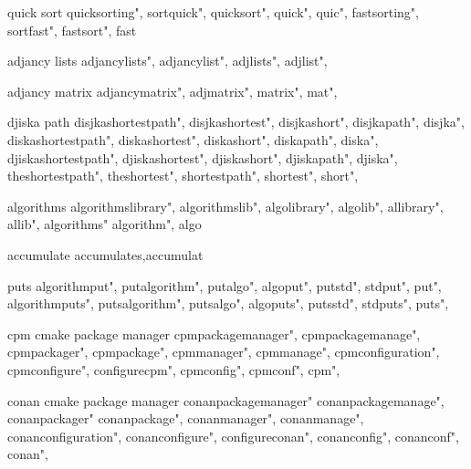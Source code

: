          quick sort 
        quicksorting",  
        sortquick",  
        quicksort",  
        quick",  
        quic",  
        fastsorting",  
        sortfast",  
        fastsort",  
        fast
        
         adjancy lists
        adjancylists",  
        adjancylist",  
        adjlists",  
        adjlist",  
        
         adjancy matrix 
        adjancymatrix",  
        adjmatrix",  
        matrix",  
        mat",  
        
         djiska path 
        disjkashortestpath",  
        disjkashortest",  
        disjkashort",  
        disjkapath",  
        disjka",  
        diskashortestpath",  
        diskashortest",  
        diskashort",  
        diskapath",  
        diska",  
        djiskashortestpath",  
        djiskashortest",  
        djiskashort",  
        djiskapath",  
        djiska",  
        theshortestpath",  
        theshortest",  
        shortestpath",  
        shortest",  
        short",  
        
         algorithms 
        algorithmslibrary", 
        algorithmslib",
        algolibrary",
        algolib",
        allibrary",
        allib",
        algorithms"
        algorithm",
        algo
        
         accumulate
        accumulates,accumulat
        
         puts 
        algorithmput",  
        putalgorithm",  
        putalgo",  
        algoput",  
        putstd",  
        stdput",  
        put",  
        algorithmputs",  
        putsalgorithm",  
        putsalgo",  
        algoputs",  
        putsstd",  
        stdputs",  
        puts",  
        
         cpm cmake package manager
        cpmpackagemanager",  
        cpmpackagemanage",  
        cpmpackager",  
        cpmpackage",  
        cpmmanager",  
        cpmmanage",  
        cpmconfiguration",  
        cpmconfigure",  
        configurecpm",  
        cpmconfig",  
        cpmconf",  
        cpm",  
        
         
         conan cmake package manager
        conanpackagemanager" 
        conanpackagemanage",
        conanpackager"
        conanpackage", 
        conanmanager", 
        conanmanage",
        conanconfiguration",
        conanconfigure",
        configureconan",
        conanconfig",
        conanconf",
        conan",
